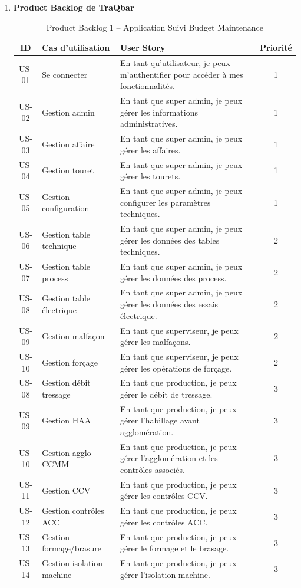 \documentclass[11pt,a4paper]{article}
\begin{document}
\begin{enumerate}
\newpage
\item \textbf{Product Backlog de TraQbar}
\begin{table}[H]
\centering
\begin{tabular}{|c|p{5cm}|p{7cm}|c|}
\hline
\textbf{ID} & \textbf{Cas d’utilisation} & \textbf{User Story} & \textbf{Priorité} \\
\hline
US-01 & Se connecter & En tant qu’utilisateur, je peux m’authentifier pour accéder à mes fonctionnalités. & 1 \\
\hline
US-02 & Gestion admin & En tant que super admin, je peux gérer les informations administratives. & 1 \\
\hline
US-03 & Gestion affaire & En tant que super admin, je peux gérer les affaires. & 1 \\
\hline
US-04 & Gestion touret & En tant que super admin, je peux gérer les tourets. & 1 \\
\hline
US-05 & Gestion configuration & En tant que super admin, je peux configurer les paramètres techniques. & 1 \\
\hline
US-06 & Gestion table technique & En tant que super admin, je peux gérer les données des tables techniques. & 2 \\
\hline
US-07 & Gestion table process & En tant que super admin, je peux gérer les données des process. & 2 \\\hline
US-08 & Gestion table électrique & En tant que super admin, je peux gérer les données des essais électrique. & 2 \\
\hline
US-09 & Gestion malfaçon & En tant que superviseur, je peux gérer les malfaçons. & 2 \\
\hline
US-10 & Gestion forçage & En tant que superviseur, je peux gérer les opérations de forçage. & 2 \\

\hline
US-08 & Gestion débit tressage & En tant que production, je peux gérer le débit de tressage. & 3 \\
\hline
US-09 & Gestion HAA & En tant que production, je peux gérer l'habillage avant agglomération. & 3 \\
\hline
US-10 & Gestion agglo CCMM & En tant que production, je peux gérer l’agglomération et les contrôles associés. & 3 \\
\hline
US-11 & Gestion CCV & En tant que production, je peux gérer les contrôles CCV. & 3 \\
\hline
US-12 & Gestion contrôles ACC & En tant que production, je peux gérer les contrôles ACC. & 3 \\
\hline
US-13 & Gestion formage/brasure & En tant que production, je peux gérer le formage et le brasage. & 3 \\
\hline
US-14 & Gestion isolation machine & En tant que production, je peux gérer l’isolation machine. & 3 \\
\hline
\end{tabular}
\caption{Product Backlog  1 – Application Suivi Budget Maintenance }
\end{table}


\end{enumerate}
\end{document}

